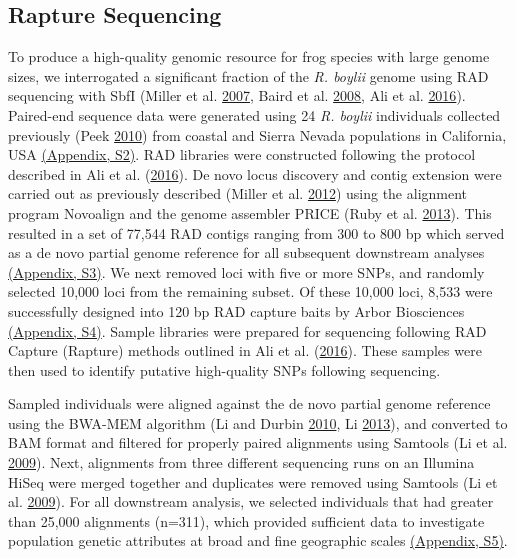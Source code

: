 \documentclass[proquest,12pt,final]{ucthesis-CA2012} %
\begin{document}
\begin{ucmainmatter}
\hypertarget{rapture2}{%
\subsection{Rapture Sequencing}\label{rapture2}}

To produce a high-quality genomic resource for frog species with large
genome sizes, we interrogated a significant fraction of the \emph{R.
boylii} genome using RAD sequencing with SbfI (Miller et al.
\protect\hyperlink{ref-miller_rapid_2007}{2007}, Baird et al.
\protect\hyperlink{ref-baird_rapid_2008}{2008}, Ali et al.
\protect\hyperlink{ref-ali_rad_2016}{2016}). Paired-end sequence data
were generated using 24 \emph{R. boylii} individuals collected
previously (Peek \protect\hyperlink{ref-peek_landscape_2010}{2010}) from
coastal and Sierra Nevada populations in California, USA
\protect\hyperlink{supptables}{(Appendix, S2)}. RAD libraries were
constructed following the protocol described in Ali et al.
(\protect\hyperlink{ref-ali_rad_2016}{2016}). De novo locus discovery
and contig extension were carried out as previously described (Miller et
al. \protect\hyperlink{ref-miller_conserved_2012}{2012}) using the
alignment program Novoalign and the genome assembler PRICE (Ruby et al.
\protect\hyperlink{ref-ruby_price_2013}{2013}). This resulted in a set
of 77,544 RAD contigs ranging from 300 to 800 bp which served as a de
novo partial genome reference for all subsequent downstream analyses
\protect\hyperlink{supptables}{(Appendix, S3)}. We next removed loci
with five or more SNPs, and randomly selected 10,000 loci from the
remaining subset. Of these 10,000 loci, 8,533 were successfully designed
into 120 bp RAD capture baits by Arbor Biosciences
\protect\hyperlink{supptables}{(Appendix, S4)}. Sample libraries were
prepared for sequencing following RAD Capture (Rapture) methods outlined
in Ali et al. (\protect\hyperlink{ref-ali_rad_2016}{2016}). These
samples were then used to identify putative high-quality SNPs following
sequencing.

Sampled individuals were aligned against the de novo partial genome
reference using the BWA-MEM algorithm (Li and Durbin
\protect\hyperlink{ref-li_fast_2010}{2010}, Li
\protect\hyperlink{ref-li_aligning_2013}{2013}), and converted to BAM
format and filtered for properly paired alignments using Samtools (Li et
al. \protect\hyperlink{ref-li_sequence_2009}{2009}). Next, alignments
from three different sequencing runs on an Illumina HiSeq were merged
together and duplicates were removed using Samtools (Li et al.
\protect\hyperlink{ref-li_sequence_2009}{2009}). For all downstream
analysis, we selected individuals that had greater than 25,000
alignments (n=311), which provided sufficient data to investigate
population genetic attributes at broad and fine geographic scales
\protect\hyperlink{supptables}{(Appendix, S5)}.


\end{ucmainmatter}
\end{document}

